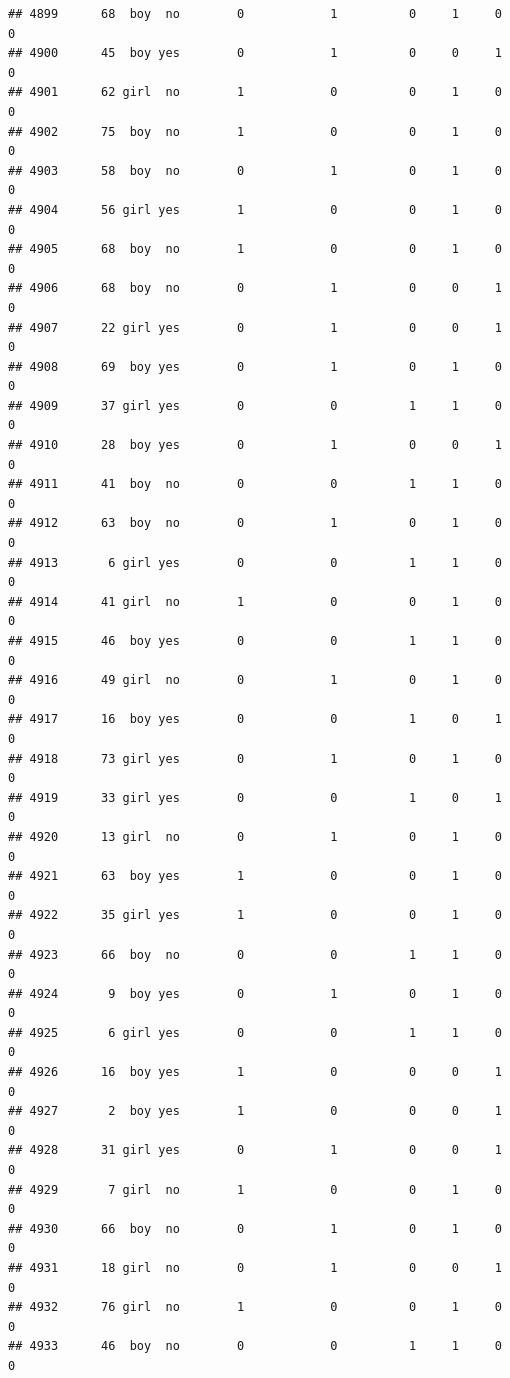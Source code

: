 \documentclass[man]{apa6}
\begin{document}
\begin{verbatim}
## 4899      68  boy  no        0            1          0     1     0     0
## 4900      45  boy yes        0            1          0     0     1     0
## 4901      62 girl  no        1            0          0     1     0     0
## 4902      75  boy  no        1            0          0     1     0     0
## 4903      58  boy  no        0            1          0     1     0     0
## 4904      56 girl yes        1            0          0     1     0     0
## 4905      68  boy  no        1            0          0     1     0     0
## 4906      68  boy  no        0            1          0     0     1     0
## 4907      22 girl yes        0            1          0     0     1     0
## 4908      69  boy yes        0            1          0     1     0     0
## 4909      37 girl yes        0            0          1     1     0     0
## 4910      28  boy yes        0            1          0     0     1     0
## 4911      41  boy  no        0            0          1     1     0     0
## 4912      63  boy  no        0            1          0     1     0     0
## 4913       6 girl yes        0            0          1     1     0     0
## 4914      41 girl  no        1            0          0     1     0     0
## 4915      46  boy yes        0            0          1     1     0     0
## 4916      49 girl  no        0            1          0     1     0     0
## 4917      16  boy yes        0            0          1     0     1     0
## 4918      73 girl yes        0            1          0     1     0     0
## 4919      33 girl yes        0            0          1     0     1     0
## 4920      13 girl  no        0            1          0     1     0     0
## 4921      63  boy yes        1            0          0     1     0     0
## 4922      35 girl yes        1            0          0     1     0     0
## 4923      66  boy  no        0            0          1     1     0     0
## 4924       9  boy yes        0            1          0     1     0     0
## 4925       6 girl yes        0            0          1     1     0     0
## 4926      16  boy yes        1            0          0     0     1     0
## 4927       2  boy yes        1            0          0     0     1     0
## 4928      31 girl yes        0            1          0     0     1     0
## 4929       7 girl  no        1            0          0     1     0     0
## 4930      66  boy  no        0            1          0     1     0     0
## 4931      18 girl  no        0            1          0     0     1     0
## 4932      76 girl  no        1            0          0     1     0     0
## 4933      46  boy  no        0            0          1     1     0     0

\end{verbatim}
\end{document}
